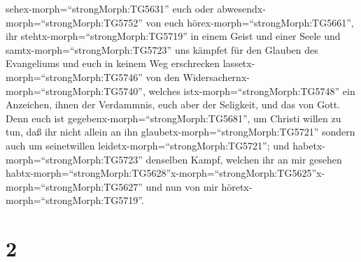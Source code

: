 sehex-morph=``strongMorph:TG5631'' euch oder
abwesendx-morph=``strongMorph:TG5752'' von euch
hörex-morph=``strongMorph:TG5661'', ihr
stehtx-morph=``strongMorph:TG5719'' in einem Geist und einer Seele und
samtx-morph=``strongMorph:TG5723'' uns kämpfet für den Glauben des
Evangeliums  und euch in keinem Weg erschrecken
lassetx-morph=``strongMorph:TG5746'' von den
Widersachernx-morph=``strongMorph:TG5740'', welches
istx-morph=``strongMorph:TG5748'' ein Anzeichen, ihnen der Verdammnis,
euch aber der Seligkeit, und das von Gott.  Denn euch ist
gegebenx-morph=``strongMorph:TG5681'', um Christi willen zu tun, daß ihr
nicht allein an ihn glaubetx-morph=``strongMorph:TG5721'' sondern auch
um seinetwillen leidetx-morph=``strongMorph:TG5721'';  und
habetx-morph=``strongMorph:TG5723'' denselben Kampf, welchen ihr an mir
gesehen
habtx-morph=``strongMorph:TG5628''\textbar x-morph=``strongMorph:TG5625''x-morph=``strongMorph:TG5627''
und nun von mir höretx-morph=``strongMorph:TG5719''.

\hypertarget{section-1}{%
\section{2}\label{section-1}}

